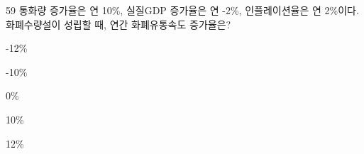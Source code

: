 \begin{question}{59}
통화량 증가율은 연 10\%, 실질GDP 증가율은 연 -2\%, 인플레이션율은 연 2\%이다. 화폐수량설이 성립할 때, 연간 화폐유통속도 증가율은?
\begin{choices}
  \item -12\%
  \item -10\%
  \item 0\%
  \item 10\%
  \item 12\%
\end{choices}
\end{question}
